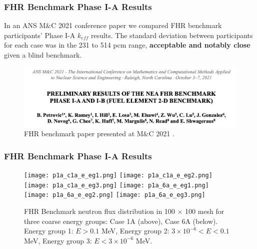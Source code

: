\begin{frame}
    \frametitle{FHR Benchmark Phase I-A Results}
    In an ANS M$\&$C 2021 conference paper we compared FHR benchmark participants' 
    Phase I-A $k_{eff}$ results. 
    The standard deviation between participants for each case was in the 231 to 514 
    pcm range, \textbf{acceptable and notably close} given a blind benchmark.

    \begin{figure}[]
        \centering
        \includegraphics[width=0.85\linewidth]{figures/mnc.png} 
        \caption{FHR benchmark paper presented at M$\&$C 2021 
        \cite{petrovic_preliminary_2021}.}
    \end{figure}
\end{frame}

\begin{frame}
    \frametitle{FHR Benchmark Phase I-A Results}
    \begin{figure}[]
        \centering
        \texttt{[image: p1a\_c1a\_e\_eg1.png]} 
        \texttt{[image: p1a\_c1a\_e\_eg2.png]} 
        \texttt{[image: p1a\_c1a\_e\_eg3.png]} 
        \texttt{[image: p1a\_6a\_e\_eg1.png]} 
        \texttt{[image: p1a\_6a\_e\_eg2.png]} 
        \texttt{[image: p1a\_6a\_e\_eg3.png]} 
        \vspace{-0.2cm}
        \caption{FHR Benchmark neutron flux 
        distribution in 100 $\times$ 100 mesh for three coarse energy groups: Case 
        1A (above), Case 6A (below). Energy group 1: $E > 0.1$ MeV, 
        Energy group 2: $3 \times 10^{-6} < E < 0.1$ MeV, Energy group 3: $E < 3 \times 10^{-6}$ MeV. }
    \end{figure}
\end{frame}
